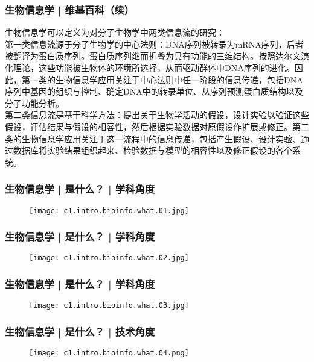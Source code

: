 \begin{frame}
  \frametitle{生物信息学 | 维基百科（续）}
  生物信息学可以定义为对分子生物学中两类信息流的研究：\\
  \vspace{1em}
  第一类信息流源于分子生物学的中心法则：DNA序列被转录为mRNA序列，后者被翻译为蛋白质序列。蛋白质序列继而折叠为具有功能的三维结构。按照达尔文演化理论，这些功能被生物体的环境所选择，从而驱动群体中DNA序列的进化。因此，第一类的生物信息学应用关注于中心法则中任一阶段的信息传递，包括DNA序列中基因的组织与控制、确定DNA中的转录单位、从序列预测蛋白质结构以及分子功能分析。\\
  \vspace{1em}
  第二类信息流是基于科学方法：提出关于生物学活动的假设，设计实验以验证这些假设，评估结果与假设的相容性，然后根据实验数据对原假设作扩展或修正。第二类的生物信息学应用关注于这一流程中的信息传递，包括产生假设、设计实验、通过数据库将实验结果组织起来、检验数据与模型的相容性以及修正假设的各个系统。
\end{frame}

\begin{frame}
  \frametitle{生物信息学 | 是什么？ | 学科角度}
  \begin{figure}
    \centering
    \texttt{[image: c1.intro.bioinfo.what.01.jpg]}
  \end{figure}
\end{frame}

\begin{frame}
  \frametitle{生物信息学 | 是什么？ | 学科角度}
  \begin{figure}
    \centering
    \texttt{[image: c1.intro.bioinfo.what.02.jpg]}
  \end{figure}
\end{frame}

\begin{frame}
  \frametitle{生物信息学 | 是什么？ | \alert{学科角度}}
  \begin{figure}
    \centering
    \texttt{[image: c1.intro.bioinfo.what.03.jpg]}
  \end{figure}
\end{frame}

\begin{frame}
  \frametitle{生物信息学 | 是什么？ | \alert{技术角度}}
  \begin{figure}
    \centering
    \texttt{[image: c1.intro.bioinfo.what.04.png]}
  \end{figure}
\end{frame}

